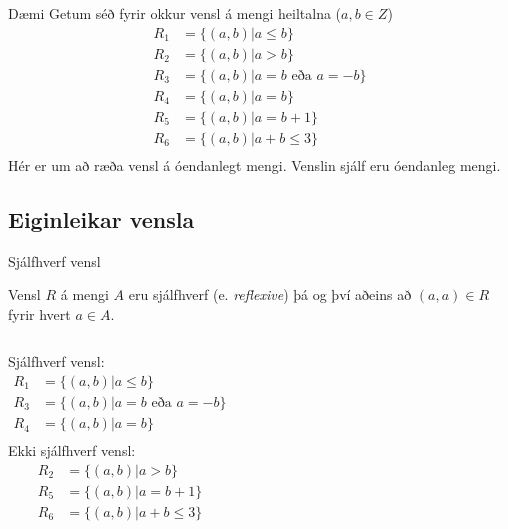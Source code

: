 \documentclass[handout]{beamer}
\begin{document}
\begin{frame}{Dæmi}
Getum séð fyrir okkur vensl á mengi heiltalna ($a, b \in Z$)
\begin{align*}
R_1 &= \{(a, b)|a \leq b\}\\
R_2 &= \{(a, b)|a > b\}\\
R_3 &= \{(a, b)|a = b \text{ eða } a = -b\}\\
R_4 &= \{(a, b)|a = b\}\\
R_5 &= \{(a, b)|a = b+1\}\\
R_6 &= \{(a, b)|a+b \leq 3\}\\
\end{align*}
Hér er um að ræða vensl á óendanlegt mengi. Venslin sjálf eru óendanleg mengi.
\end{frame}

\subsection{Eiginleikar vensla}

\begin{frame}{Sjálfhverf vensl}
\begin{tcolorbox}[title=Sjálfhverf vensl]
Vensl $R$ á mengi $A$ eru sjálfhverf (e. \emph{reflexive}) þá og því aðeins að $(a, a) \in R$ fyrir hvert $a \in A$.
\end{tcolorbox}
\vspace{0.5cm}
\begin{columns}
Sjálfhverf vensl:
\begin{align*}
R_1 &= \{(a, b)|a \leq b\}\\
R_3 &= \{(a, b)|a = b \text{ eða } a = -b\}\\
R_4 &= \{(a, b)|a = b\}\\
\end{align*}
Ekki sjálfhverf vensl:
\begin{align*}
R_2 &= \{(a, b)|a > b\}\\
R_5 &= \{(a, b)|a = b+1\}\\
R_6 &= \{(a, b)|a+b \leq 3\}\\
\end{align*}
\end{columns}
\end{frame}
\end{document}
